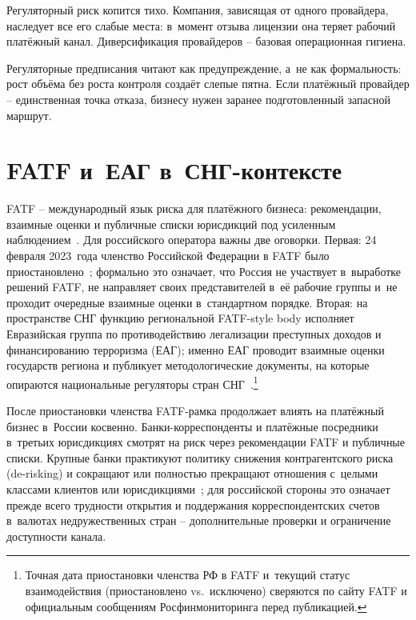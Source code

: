 Регуляторный риск копится тихо. Компания, зависящая от одного
провайдера, наследует все его слабые места: в~момент отзыва лицензии
она теряет рабочий платёжный канал. Диверсификация провайдеров --
базовая операционная гигиена.

Регуляторные предписания читают как предупреждение, а~не как
формальность: рост объёма без роста контроля создаёт слепые пятна.
Если платёжный провайдер -- единственная точка отказа, бизнесу нужен
заранее подготовленный запасной маршрут.

\section{FATF и~ЕАГ в~СНГ-контексте}\label{sec:compliance-fatf}

FATF -- международный язык риска для платёжного бизнеса:
рекомендации, взаимные оценки и публичные списки юрисдикций
под усиленным наблюдением~\cite{fatf-recs,fatf-increased-monitoring}.
Для российского оператора важны две оговорки. Первая:
24 февраля 2023~года членство Российской Федерации в FATF
было приостановлено~\cite{fatf-russia-suspension-2023};
формально это означает, что Россия не участвует
в~выработке решений FATF, не направляет своих представителей
в~её рабочие группы и~не проходит очередные взаимные оценки
в~стандартном порядке. Вторая: на пространстве СНГ функцию
региональной FATF-style body исполняет Евразийская группа
по противодействию легализации преступных доходов и финансированию
терроризма (ЕАГ); именно ЕАГ проводит взаимные оценки государств
региона и публикует методологические документы, на которые
опираются национальные регуляторы стран
СНГ~\cite{eag-overview,eag-mutual-evaluations}.\footnote{Точная
дата приостановки членства РФ в FATF и~текущий статус
взаимодействия (приостановлено vs.\ исключено) сверяются
по сайту FATF и официальным сообщениям Росфинмониторинга
перед публикацией.}

После приостановки членства FATF-рамка продолжает влиять на
платёжный бизнес в~России косвенно. Банки-корреспонденты и платёжные
посредники в~третьих юрисдикциях смотрят на риск через рекомендации
FATF и публичные списки. Крупные банки практикуют политику снижения
контрагентского риска (de-risking) и сокращают или полностью
прекращают отношения с~целыми классами клиентов или
юрисдикциями~\cite{fatf-correspondent-banking}; для российской
стороны это означает прежде всего трудности открытия и поддержания
корреспондентских счетов в~валютах недружественных стран --
дополнительные проверки и ограничение доступности канала.

